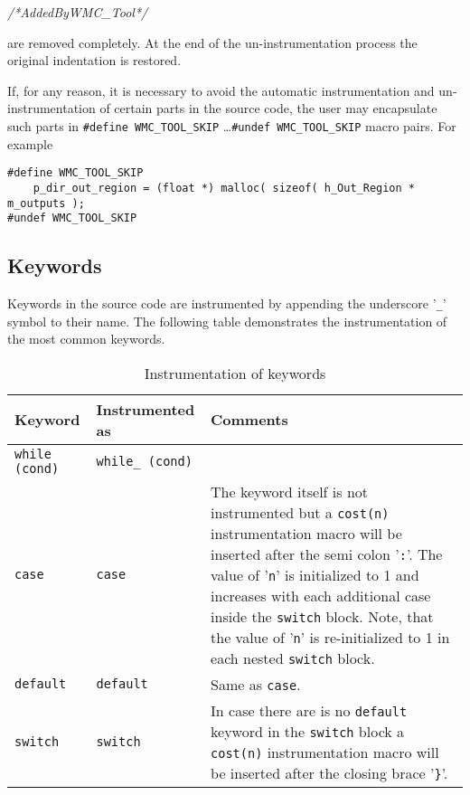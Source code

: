 {
{\em /*AddedByWMC\_Tool*/}
}

are removed completely. At the end of the un-instrumentation process the original indentation is restored.

If, for any reason, it is necessary to avoid the automatic instrumentation and un-instrumentation of certain parts in the source code, the user may encapsulate such parts in \verb|#define WMC_TOOL_SKIP| \ldots \verb|#undef WMC_TOOL_SKIP| macro pairs. For example

\begin{Verbatim}[fontsize=\small]
#define WMC_TOOL_SKIP
    p_dir_out_region = (float *) malloc( sizeof( h_Out_Region * m_outputs );
#undef WMC_TOOL_SKIP
\end{Verbatim}

\subsection{Keywords}

Keywords in the source code are instrumented by appending the underscore '\verb|_|' symbol to their name. The following table demonstrates the instrumentation of the most common keywords.

\begin{table}
\raggedleft\small
\caption{Instrumentation of keywords}
\begin{tabular}{|l|p{}<{\raggedright}|p{}<{\raggedright}|}
\hline
\textbf{Keyword} & \textbf{Instrumented as} & \textbf{Comments} \\
\hline
\verb|while (cond)| & \verb|while_ (cond)| & \\
\hline
\verb|case| & \verb|case| & The keyword itself is not instrumented but a \verb|cost(n)| instrumentation macro will be inserted after the semi colon '\verb|:|'. The value of '\verb|n|' is initialized to 1 and increases with each additional case inside the \verb|switch| block. Note, that the value of '\verb|n|' is re-initialized to 1 in each nested \verb|switch| block. \\
\hline
\verb|default| & \verb|default| & Same as \verb|case|. \\
\hline
\verb|switch| & \verb|switch| & In case there are is no \verb|default| keyword in the \verb|switch| block a \verb|cost(n)| instrumentation macro will be inserted after the closing brace '\verb|}|'. \\
\hline
\end{tabular}
\label{tab:instrumentation_of_keywords}
\end{table}

